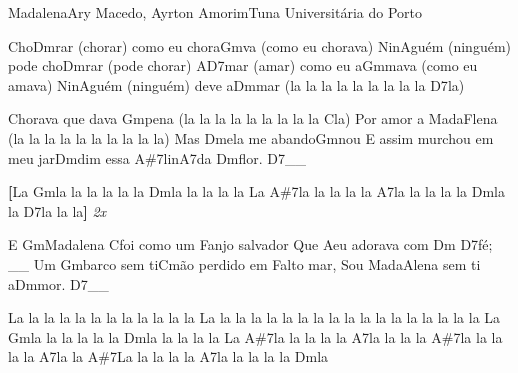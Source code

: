 \begin{musica}{Madalena}{Ary Macedo, Ayrton Amorim}{Tuna Universitária do Porto}

Cho\ac{Dm}{rar} (chorar) como eu chora\ac{Gm}{va} (como eu chorava)
Nin\ac{A}{guém} (ninguém) pode cho\ac{Dm}{rar} (pode chorar)
A\ac{D7}{mar} (amar) como eu a\ac{Gm}{ma}va (como eu amava)
Nin\ac{A}{guém} (ninguém) deve a\ac{Dm}{mar} (la la la la la la la la la \ac{D7}{la})

Chorava que dava \ac{Gm}{pe}na (la la la la la la la la la \ac{C}{la})
Por amor a Mada\ac{F}{le}na (la la la la la la la la la la)
Mas \ac{Dm}{e}la me abando\ac{Gm}{nou}
E assim murchou em meu jar\ac{Dm}{dim} essa \ac{A#7}{li}n\ac{A7}{da} \ac{Dm}{flor}. \ac{D7}{}__

\textbf{[}La \ac{Gm}{la} la la la la la \ac{Dm}{la} la la la la
La \ac{A#7}{la} la la la la \ac{A7}{la} la la la la \ac{Dm}{la} la \ac{D7}{la} la la\textbf{]} \textit{2x}

E \ac{Gm}{Ma}dalena \ac{C}{foi} como um \ac{F}{an}jo salvador
Que \ac{A}{eu} adorava com \ac{Dm D7}{fé}; __
Um \ac{Gm}{bar}co sem ti\ac{C}{mão} perdido em \ac{F}{al}to mar,
Sou Mada\ac{A}{le}na sem ti a\ac{Dm}{mor}. \ac{D7}{}__

La la la la la la la la la la la la
La la la la la la la la la la la la la la la la la la
La \ac{Gm}{la} la la la la la \ac{Dm}{la} la la la la
La \ac{A#7}{la} la la la la \ac{A7}{la} la la la \ac{A#7}{la} la la la la \ac{A7}{la} la
\ac{A#7}{La} la la la la \ac{A7}{la} la la la la \ac{Dm}{la}

\end{musica}
